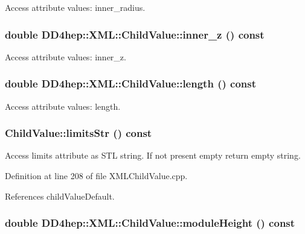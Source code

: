 Access attribute values: inner\_\-radius. \hypertarget{struct_d_d4hep_1_1_x_m_l_1_1_child_value_a6472bfae1581781385383c48678a75b4}{
\subsubsection[{inner\_\-z}]{\setlength{\rightskip}{0pt plus 5cm}double DD4hep::XML::ChildValue::inner\_\-z () const}}
\label{struct_d_d4hep_1_1_x_m_l_1_1_child_value_a6472bfae1581781385383c48678a75b4}


Access attribute values: inner\_\-z. \hypertarget{struct_d_d4hep_1_1_x_m_l_1_1_child_value_aaacd385c7454cbb1a8bc6bfb6cd2b7dd}{
\subsubsection[{length}]{\setlength{\rightskip}{0pt plus 5cm}double DD4hep::XML::ChildValue::length () const}}
\label{struct_d_d4hep_1_1_x_m_l_1_1_child_value_aaacd385c7454cbb1a8bc6bfb6cd2b7dd}


Access attribute values: length. \hypertarget{struct_d_d4hep_1_1_x_m_l_1_1_child_value_a6aa93ecd3599cb12e8d455173d5a9d79}{
\subsubsection[{limitsStr}]{ ChildValue::limitsStr () const}}
\label{struct_d_d4hep_1_1_x_m_l_1_1_child_value_a6aa93ecd3599cb12e8d455173d5a9d79}


Access limits attribute as STL string. If not present empty return empty string. 

Definition at line 208 of file XMLChildValue.cpp.

References childValueDefault.\hypertarget{struct_d_d4hep_1_1_x_m_l_1_1_child_value_a1db2990dc4eff71eae498a9a47dc3a33}{
\subsubsection[{moduleHeight}]{\setlength{\rightskip}{0pt plus 5cm}double DD4hep::XML::ChildValue::moduleHeight () const}}
\label{struct_d_d4hep_1_1_x_m_l_1_1_child_value_a1db2990dc4eff71eae498a9a47dc3a33}


